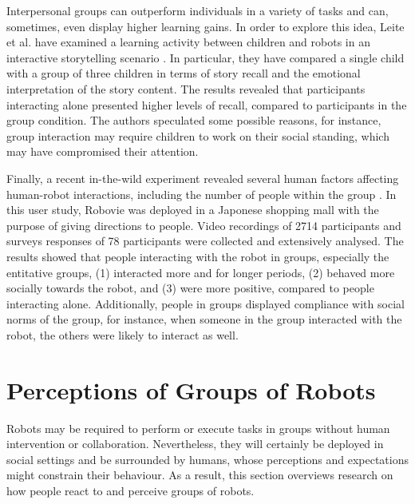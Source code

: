 Interpersonal groups can outperform individuals in a variety of tasks and can, sometimes, even display higher learning gains. In order to explore this idea, Leite et al. have examined a learning activity between children and robots in an interactive storytelling scenario \cite{leite2015emotional}. In particular, they have compared a single child with a group of three children in terms of story recall and the emotional interpretation of the story content. The results revealed that participants interacting alone presented higher levels of recall, compared to participants in the group condition. The authors speculated some possible reasons, for instance, group interaction may require children to work on their social standing, which may have compromised their attention.

Finally, a recent in-the-wild experiment revealed several human factors affecting human-robot interactions, including the number of people within the group \cite{fraune2019humangroup}. In this user study, Robovie was deployed in a Japonese shopping mall with the purpose of giving directions to people. Video recordings of 2714 participants and surveys responses of 78 participants were collected and extensively analysed. The results showed that people interacting with the robot in groups, especially the entitative groups, (1) interacted more and for longer periods, (2) behaved more socially towards the robot, and (3) were more positive, compared to people interacting alone. Additionally, people in groups displayed compliance with social norms of the group, for instance, when someone in the group interacted with the robot, the others were likely to interact as well.



\section{Perceptions of Groups of Robots}
\label{sec:perceptions}
Robots may be required to perform or execute tasks in groups without human intervention or collaboration. Nevertheless, they will certainly be deployed in social settings and be surrounded by humans, whose perceptions and expectations might constrain their behaviour. As a result, this section overviews research on how people react to and perceive groups of robots. 

